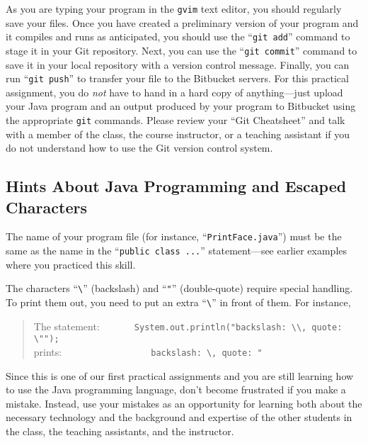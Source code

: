 As you are typing your program in the {\tt gvim} text editor, you should regularly save your files.  Once you have
created a preliminary version of your program and it compiles and runs as anticipated, you should use the ``{\tt git
add}'' command to stage it in your Git repository.  Next, you can use the ``{\tt git commit}'' command to save it in
your local repository with a version control message.  Finally, you can run ``{\tt git push}'' to transfer your file to
the Bitbucket servers.  For this practical assignment, you do {\em not} have to hand in a hard copy of anything---just
upload your Java program and an output produced by your program to Bitbucket using the appropriate {\tt git} commands.
Please review your ``Git Cheatsheet'' and talk with a member of the class, the course instructor, or a teaching
assistant if you do not understand how to use the Git version control system.

\vspace*{-.1in}
\subsection*{Hints About Java Programming and Escaped Characters}
\vspace*{-.05in}

The name of your program file (for instance, ``{\tt PrintFace.java}'') must be the same as the name in the ``{\tt public
  class ...}'' statement---see earlier examples where you practiced this skill.

The characters ``\verb$\$'' (backslash) and ``\verb$"$'' (double-quote)
require special handling. To print them out, you need to put an extra
``\verb$\$'' in front of them. For instance,

\vspace*{-.1in}
\begin{quote}
The statement:\ \ \ \ \ \ \ \verb$System.out.println("backslash: \\, quote: \"");$\\
prints:\ \ \ \ \ \ \ \ \ \ \ \ \ \ \ \ \ \
\verb$backslash: \, quote: "$
\end{quote}
\vspace*{-.1in}

Since this is one of our first practical assignments and you are still learning how to use the Java programming
language, don't become frustrated if you make a mistake. Instead, use your mistakes as an opportunity for learning both
about the necessary technology and the background and expertise of the other students in the class, the teaching
assistants, and the instructor.

